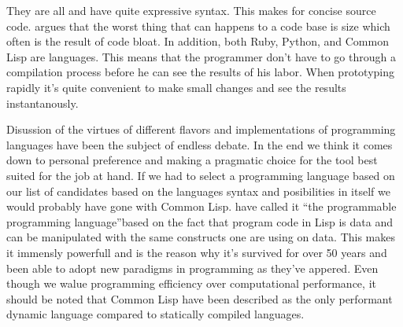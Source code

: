 They are all %
and have quite expressive syntax. This makes for concise source code.
\citet{yegge07} argues that the worst thing that can happens to a code base is
size which often is the result of code bloat. In addition, both Ruby, Python,
and Common Lisp are  languages.%
This means that the programmer don't have to go through a compilation process
before he can see the results of his labor. When prototyping rapidly it's
quite convenient to make small changes and see the results instantanously.

Disussion of the virtues of different flavors and implementations of
programming languages have been the subject of endless debate.
In the end we think it comes down to
personal preference and making a pragmatic choice for the tool best suited for
the job at hand. If we had to select a programming language based on our list
of candidates based on the languages syntax and posibilities in itself we
would probably have gone with Common Lisp. \citet[]{foderaro91} have
called it ``the programmable programming language''based on the fact that
program code in Lisp is data and can be manipulated with the same constructs
one are using on data. This makes it immensly powerfull and is the reason why
it's survived for over 50 years \citep[]{mccarthy78}
and been able to adopt new paradigms in programming as they've appered.
Even though we walue programming efficiency over computational performance,
it should be noted that Common Lisp have been described as the only performant
dynamic language \citep{martin08} compared to statically compiled languages.%

